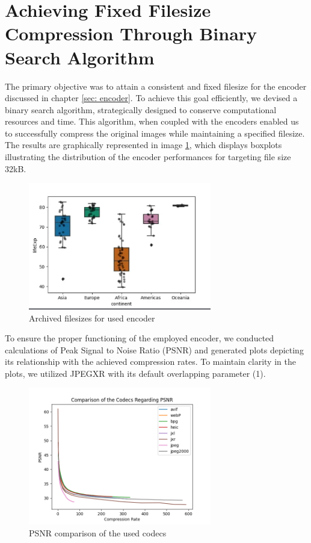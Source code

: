 \documentclass{article}
\begin{document}
\newpage
\section{Achieving Fixed Filesize Compression Through Binary Search Algorithm}
\label{sec: filesize}

The primary objective was to attain a consistent and fixed filesize for the encoder discussed in chapter \ref{sec: encoder}. To achieve this goal efficiently, we devised a binary search algorithm, strategically designed to conserve computational resources and time. This algorithm, when coupled with the encoders enabled us to successfully compress the original images while maintaining a specified filesize. The results are graphically represented in image \ref{fig: fsize_comparison}, which displays boxplots illustrating the distribution of the encoder performances for targeting file size 32kB.

\begin{figure}[h!]
	\centering
	\includegraphics[width=8cm]{filesize_comparison.png}
	\caption{Archived filesizes for used encoder}
	\label{fig: fsize_comparison}
\end{figure}

\noindent
To ensure the proper functioning of the employed encoder, we conducted calculations of Peak Signal to Noise Ratio (PSNR) and generated plots depicting its relationship with the achieved compression rates. To maintain clarity in the plots, we utilized JPEGXR with its default overlapping parameter (1).

\begin{figure}[h!]
	\centering
	\includegraphics[width=8cm]{psnr.png}
	\caption{PSNR comparison of the used codecs}
	\label{fig: psnr_comparison}
\end{figure}
\end{document}
